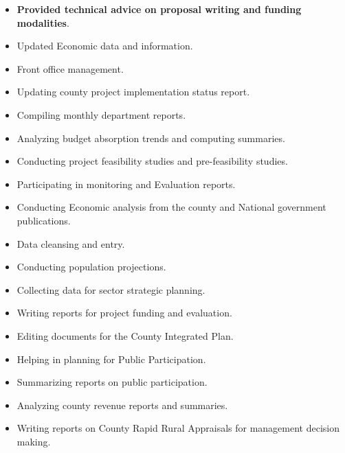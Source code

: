 \documentclass[theme]{cv_einstein}
\begin{document}
\begin{paracol}{2}
\begin{rightcolumn}
            {
                \begin{itemize}
                    \item \textbf{Provided technical advice on proposal writing and funding modalities}.
                    \item Updated Economic data and information.
                    \item Front office management.
                    \item Updating county project implementation status report.
                    \item Compiling monthly department reports.
                    \item Analyzing budget absorption trends and computing summaries.
                    \item Conducting project feasibility studies and pre-feasibility studies.
                    \item Participating in monitoring and Evaluation reports.
                    \item Conducting Economic analysis from the county and National government publications.
                    \item Data cleansing and entry.
                    \item Conducting population projections.
                    \item Collecting data for sector strategic planning.
                    \item Writing reports for project funding and evaluation.
                    \item Editing documents for the County Integrated Plan.
                    \item Helping in planning for Public Participation.
                    \item Summarizing reports on public participation.
                    \item Analyzing county revenue reports and summaries.
                    \item Writing reports on County Rapid Rural Appraisals for management decision making.
                \end{itemize}
            }
            \vspace{\itemspace}\\
            

\end{rightcolumn}
\end{paracol}
\end{document}
